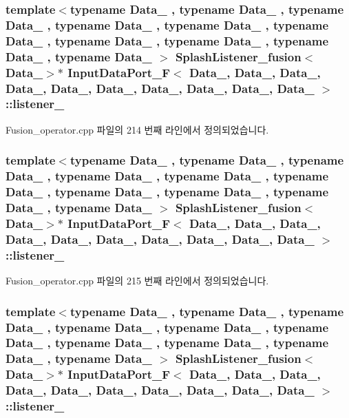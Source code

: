 \subsubsection[{\texorpdfstring{listener\+\_\+3}{listener_3}}]{\setlength{\rightskip}{0pt plus 5cm}template$<$typename Data\+\_ , typename Data\+\_ , typename Data\+\_ , typename Data\+\_ , typename Data\+\_ , typename Data\+\_ , typename Data\+\_ , typename Data\+\_ , typename Data\+\_ , typename Data\+\_ $>$ {\bf Splash\+Listener\+\_\+fusion}$<$Data\+\_$>$$\ast$ {\bf Input\+Data\+Port\+\_\+F}$<$ Data\+\_, Data\+\_, Data\+\_, Data\+\_, Data\+\_, Data\+\_, Data\+\_, Data\+\_, Data\+\_, Data\+\_ $>$\+::listener\+\_}\hypertarget{classInputDataPort__F_af34ec96b45b9f778eebac6e72901901a}{}\label{classInputDataPort__F_af34ec96b45b9f778eebac6e72901901a}


Fusion\+\_\+operator.\+cpp 파일의 214 번째 라인에서 정의되었습니다.

\subsubsection[{\texorpdfstring{listener\+\_\+4}{listener_4}}]{\setlength{\rightskip}{0pt plus 5cm}template$<$typename Data\+\_ , typename Data\+\_ , typename Data\+\_ , typename Data\+\_ , typename Data\+\_ , typename Data\+\_ , typename Data\+\_ , typename Data\+\_ , typename Data\+\_ , typename Data\+\_ $>$ {\bf Splash\+Listener\+\_\+fusion}$<$Data\+\_$>$$\ast$ {\bf Input\+Data\+Port\+\_\+F}$<$ Data\+\_, Data\+\_, Data\+\_, Data\+\_, Data\+\_, Data\+\_, Data\+\_, Data\+\_, Data\+\_, Data\+\_ $>$\+::listener\+\_}\hypertarget{classInputDataPort__F_a2306c92d87224281fbe8af0c1f4a7b1a}{}\label{classInputDataPort__F_a2306c92d87224281fbe8af0c1f4a7b1a}


Fusion\+\_\+operator.\+cpp 파일의 215 번째 라인에서 정의되었습니다.

\subsubsection[{\texorpdfstring{listener\+\_\+5}{listener_5}}]{\setlength{\rightskip}{0pt plus 5cm}template$<$typename Data\+\_ , typename Data\+\_ , typename Data\+\_ , typename Data\+\_ , typename Data\+\_ , typename Data\+\_ , typename Data\+\_ , typename Data\+\_ , typename Data\+\_ , typename Data\+\_ $>$ {\bf Splash\+Listener\+\_\+fusion}$<$Data\+\_$>$$\ast$ {\bf Input\+Data\+Port\+\_\+F}$<$ Data\+\_, Data\+\_, Data\+\_, Data\+\_, Data\+\_, Data\+\_, Data\+\_, Data\+\_, Data\+\_, Data\+\_ $>$\+::listener\+\_}\hypertarget{classInputDataPort__F_aba79969b7956c70a2f2101fc55370447}{}\label{classInputDataPort__F_aba79969b7956c70a2f2101fc55370447}


